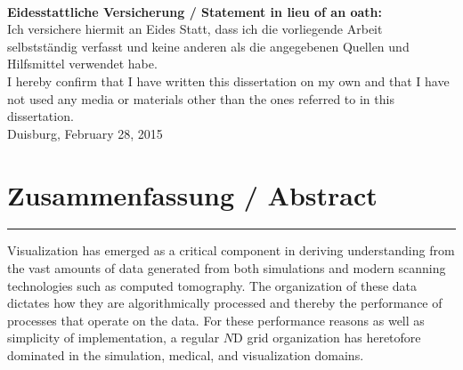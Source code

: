 %
%

\clearpage
\thispagestyle{empty}
~
\begin{flushleft}
  \textbf{Eidesstattliche Versicherung / Statement in lieu of an oath:}\\
  Ich versichere hiermit an Eides Statt, dass ich die vorliegende
  Arbeit selbstst\"andig verfasst und keine anderen als die angegebenen
  Quellen und Hilfsmittel verwendet habe.\\

  I hereby confirm that I have written this dissertation on my own
  and that I have not used any media or materials other than the ones
  referred to in this dissertation.\\[\baselineskip]

	Duisburg, February 28, 2015\\

\end{flushleft}

\clearpage

\section*{Zusammenfassung / Abstract}


\vspace{1em}

\hrule{}
\vspace{1em}

Visualization has emerged as a critical component in deriving
understanding from the vast amounts of data generated from both
simulations and modern scanning technologies such as computed
tomography.  The organization of these data dictates how they are
algorithmically processed and thereby the performance of processes
that operate on the data.  For these performance reasons as well as
simplicity of implementation, a regular $N$D grid organization has
heretofore dominated in the simulation, medical, and visualization
domains.

